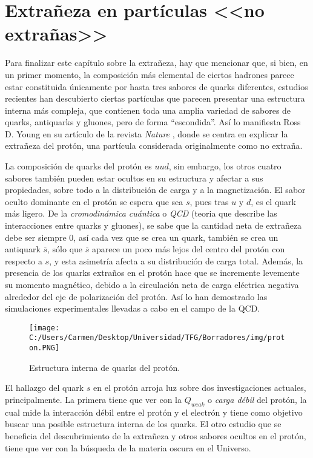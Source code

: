 \section{Extrañeza en partículas <<no extrañas>>}
\label{cap:non-strange_particles}
\vspace{5mm}

Para finalizar este capítulo sobre la extrañeza, hay que mencionar que, si bien, en un primer momento, la composición más elemental de ciertos hadrones parece estar constituida únicamente por hasta tres sabores de quarks diferentes, estudios recientes han descubierto ciertas partículas que parecen presentar una estructura interna más compleja, que contienen toda una amplia variedad de sabores de quarks, antiquarks y gluones, pero de forma ``escondida''. Así lo manifiesta Ross D. Young en su artículo de la revista \textit{Nature} \cite{protonYoung}, donde se centra en explicar la extrañeza del protón, una partícula considerada originalmente como no extraña. 

La composición de quarks del protón es $uud$, sin embargo, los otros cuatro sabores también pueden estar ocultos en su estructura y afectar a sus propiedades, sobre todo a la distribución de carga y a la magnetización. El sabor oculto dominante en el protón se espera que sea $s$, pues tras $u$ y $d$, es el quark más ligero. De la \textit{cromodinámica cuántica} o \textit{QCD} (teoria que describe las interacciones entre quarks y gluones), se sabe que la cantidad neta de extrañeza debe ser siempre 0, así cada vez que se crea un quark, también se crea un antiquark $\overline{s}$, sólo que $\overline{s}$ aparece un poco más lejos del centro del protón con respecto a $s$, y esta asimetría afecta a su distribución de carga total. Además, la presencia de los quarks extraños en el protón hace que se incremente levemente su momento magnético, debido a la circulación neta de carga eléctrica negativa alrededor del eje de polarización del protón.\cite{protonYoung} Así lo han demostrado las simulaciones experimentales llevadas a cabo en el campo de la QCD.\\

\begin{figure}[h]
	\centering
	\texttt{[image: C:/Users/Carmen/Desktop/Universidad/TFG/Borradores/img/proton.PNG]}
	\caption[Estructura interna del protón]
	{Estructura interna de quarks del protón. \cite{protonYoung}}
	\label{fig:proton}
\end{figure}

El hallazgo del quark $s$ en el protón arroja luz sobre dos investigaciones actuales, principalmente. La primera tiene que ver con la $Q_{weak}$ o \textit{carga débil} del protón, la cual mide la  interacción débil entre el protón y el electrón y tiene como objetivo buscar una posible estructura interna de los quarks. El otro estudio que se beneficia del descubrimiento de la extrañeza y otros sabores ocultos en el protón, tiene que ver con la búsqueda de la materia oscura en el Universo. 

